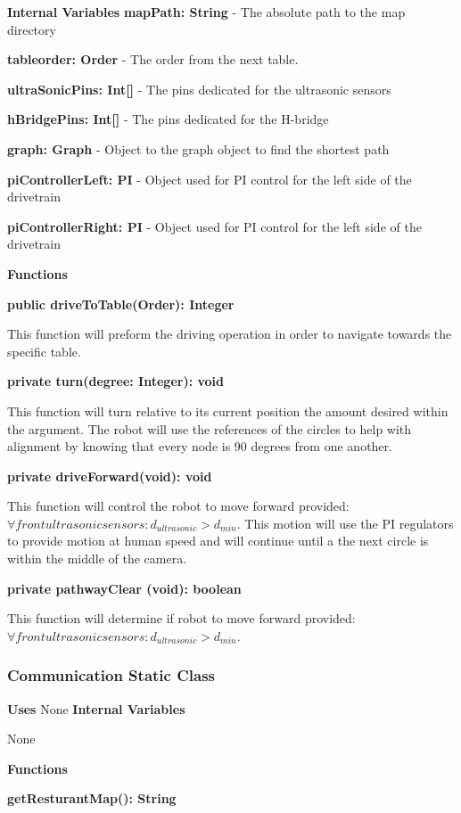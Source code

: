\documentclass [10pt]{article}
\begin{document}
\textbf{Internal Variables}
\textbf{mapPath: String} - The absolute path to the map directory

\textbf{tableorder: Order} - The order from the next table.

\textbf{ultraSonicPins: Int[]} - The pins dedicated for the ultrasonic sensors

\textbf{hBridgePins: Int[]} - The pins dedicated for the H-bridge

\textbf{graph: Graph} - Object to the graph object to find the shortest path

\textbf{piControllerLeft: PI} - Object used for PI control for the left side of the drivetrain

\textbf{piControllerRight: PI} - Object used for PI control for the left side of the drivetrain

\textbf{Functions}

\textbf{public driveToTable(Order): Integer}

This function will preform the driving operation in order to navigate towards the specific table.

\textbf{private turn(degree: Integer): void}

This function will turn relative to its current position the amount desired within the argument. The robot will use the references of the circles to help with alignment by knowing that every node is 90 degrees from one another.

\textbf{private driveForward(void): void}

This function will control the robot to move forward provided: $ \forall front ultrasonic sensors: d_{ultrasonic} > d_{min} $. This motion will use the PI regulators to provide motion at human speed and will continue until a the next circle is within the middle of the camera.

\textbf{private pathwayClear (void): boolean}

This function will determine if robot to move forward provided: $ \forall front ultrasonic sensors: d_{ultrasonic} > d_{min} $. 

\subsubsection{Communication Static Class}
\textbf{Uses}
None 
\textbf{Internal Variables}

None 

\textbf{Functions}

\textbf{getResturantMap(): String}
\end{document}
